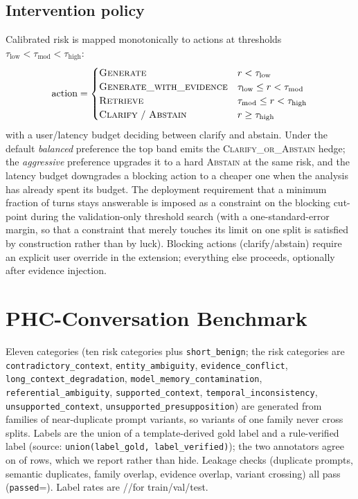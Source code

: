 \documentclass[10pt]{article}
\begin{document}
\subsection{Intervention policy}
Calibrated risk is mapped monotonically to actions at thresholds
$\tau_{\text{low}}<\tau_{\text{mod}}<\tau_{\text{high}}$:
\[
\text{action}=
\begin{cases}
\textsc{Generate} & r<\tau_{\text{low}}\\
\textsc{Generate\_with\_evidence} & \tau_{\text{low}}\le r<\tau_{\text{mod}}\\
\textsc{Retrieve} & \tau_{\text{mod}}\le r<\tau_{\text{high}}\\
\textsc{Clarify}\ /\ \textsc{Abstain} & r\ge\tau_{\text{high}}
\end{cases}
\]
with a user/latency budget deciding between clarify and abstain. Under the
default \emph{balanced} preference the top band emits the
\textsc{Clarify\_or\_Abstain} hedge; the \emph{aggressive} preference upgrades
it to a hard \textsc{Abstain} at the same risk, and the latency budget
downgrades a blocking action to a cheaper one when the analysis has already
spent its budget. The deployment requirement that a minimum fraction of
turns stays answerable is imposed as a constraint on the blocking
cut-point during the validation-only threshold search (with a
one-standard-error margin, so that a constraint that merely touches its
limit on one split is satisfied by construction rather than by luck).
Blocking
actions (clarify/abstain) require an explicit user override in the
extension; everything else proceeds, optionally after evidence injection.

\section{PHC-Conversation Benchmark}
Eleven categories (ten risk categories plus \texttt{short\_benign}; the risk
categories are \texttt{contradictory\_context}, \texttt{entity\_ambiguity},
\texttt{evidence\_conflict}, \texttt{long\_context\_degradation},
\texttt{model\_memory\_contamination}, \texttt{referential\_ambiguity},
\texttt{supported\_context}, \texttt{temporal\_inconsistency},
\texttt{unsupported\_context}, \texttt{unsupported\_presupposition}) are
generated from \nfamilies{} families of near-duplicate prompt variants, so
variants of one family never cross splits. Labels are the union of a
template-derived gold label and a rule-verified label (source:
\texttt{union(label\_gold, label\_verified)}); the two annotators agree on
\agreement{} of rows, which we report rather than hide. Leakage checks
(duplicate prompts, semantic duplicates, family overlap, evidence overlap,
variant crossing) all pass (\texttt{passed}=\leakage). Label rates are
 \trainrate/\valrate/\testrate for train/val/test.
\end{document}
